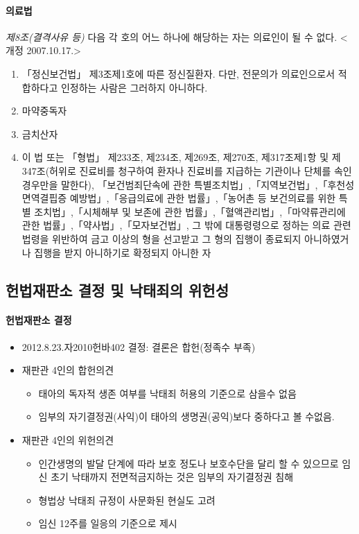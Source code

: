 \paragraph{의료법}\par
\emph{제8조(결격사유 등)} 다음 각 호의 어느 하나에 해당하는 자는 의료인이 될 수 없다.  <개정 2007.10.17.>
	\begin{enumerate}[1.]\tightlist
	\item 「정신보건법」 제3조제1호에 따른 정신질환자. 다만, 전문의가 의료인으로서 적합하다고 인정하는 사람은 그러하지 아니하다.
	\item 마약 중독자
	\item 금치산자
	\item 이 법 또는 「형법」 제233조, 제234조, 제269조, 제270조, 제317조제1항 및 제347조(허위로 진료비를 청구하여 환자나 진료비를 지급하는 기관이나 단체를 속인 경우만을 말한다), 「보건범죄단속에 관한 특별조치법」,「지역보건법」,「후천성면역결핍증 예방법」,「응급의료에 관한 법률」,「농어촌 등 보건의료를 위한 특별 조치법」,「시체해부 및 보존에 관한 법률」,「혈액관리법」,「마약류관리에 관한 법률」,「약사법」,「모자보건법」, 그 밖에 대통령령으로 정하는 의료 관련 법령을 위반하여 금고 이상의 형을 선고받고 그 형의 집행이 종료되지 아니하였거나 집행을 받지 아니하기로 확정되지 아니한 자
	\end{enumerate}
\subsection{헌법재판소 결정 및 낙태죄의 위헌성}
\paragraph{헌법재판소 결정}
\begin{itemize}\tightlist
\item 2012.8.23.자2010헌바402 결정: 결론은 합헌(정족수 부족)
\item 재판관 4인의 합헌의견
	\begin{itemize}\tightlist
	\item 태아의 독자적 생존 여부를 낙태죄 허용의 기준으로 삼을수 없음
	\item 임부의 자기결정권(사익)이 태아의 생명권(공익)보다 중하다고 볼 수없음.
	\end{itemize}
\item 재판관 4인의 위헌의견
	\begin{itemize}\tightlist
	\item 인간생명의 발달 단계에 따라 보호 정도나 보호수단을 달리 할 수 있으므로 임신 초기 낙태까지 전면적 금지하는 것은 임부의 자기결정권 침해
	\item 형법상 낙태죄 규정이 사문화된 현실도 고려
	\item 임신 12주를 일응의 기준으로 제시
	\end{itemize}
\end{itemize}
